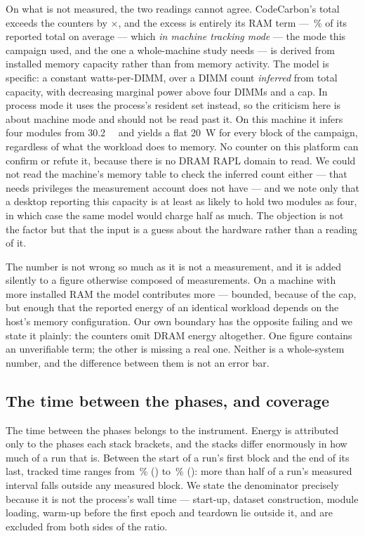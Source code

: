 On what is not measured, the two readings cannot agree. CodeCarbon's total exceeds
the counters by \vCCtotalRatio$\times$, and the excess is entirely its RAM term
--- \vCCramSharePct\,\% of its reported total on average --- which \emph{in machine
tracking mode} --- the mode this campaign used, and the one a whole-machine
study needs --- is derived from installed memory capacity rather than from
memory activity. The model is specific: a constant watts-per-DIMM, over a DIMM
count \emph{inferred} from total capacity, with decreasing marginal power above
four DIMMs and a cap. In process mode it uses the process's resident set
instead, so the criticism here is about machine mode and should not be read past
it. On this machine it infers four modules from \SI{30.2}{\giga\byte} and
yields a flat \SI{20}{\watt} for every block of the campaign,
regardless of what the workload does to memory. No counter on this platform can
confirm or refute it, because there is no DRAM RAPL domain to read. We could not
read the machine's memory table to check the inferred count either --- that
needs privileges the measurement account does not have --- and we note only that
a desktop reporting this capacity is at least as likely to hold two modules as
four, in which case the same model would charge half as much. The objection is
not the factor but that the input is a guess about the hardware rather than a
reading of it.

The number is not wrong so much as it is not a measurement, and it is added
silently to a figure otherwise composed of measurements. On a machine with more
installed RAM the model contributes more --- bounded, because of the cap, but
enough that the reported energy of an identical workload depends on the host's
memory configuration. Our own boundary has the opposite failing and we state it
plainly: the counters omit DRAM energy altogether. One figure contains an
unverifiable term; the other is missing a real one. Neither is a whole-system
number, and the difference between them is not an error bar.

\subsection{The time between the phases, and coverage}
\label{app:coverage}

The time between the phases belongs to the instrument.
Energy is attributed only to the phases each stack brackets, and the stacks
differ enormously in how much of a run that is. Between the start of a run's
first block and the end of its last, tracked time ranges from
\vCoverageMin\,\% (\vCoverageWorstEco) to \vCoverageMax\,\%
(\vCoverageBestEco): more than half of a \vCoverageWorstEco{} run's measured
interval falls outside any measured block. We state the denominator precisely
because it is not the process's wall time --- start-up, dataset construction,
module loading, warm-up before the first epoch and teardown lie outside it, and
are excluded from both sides of the ratio.

